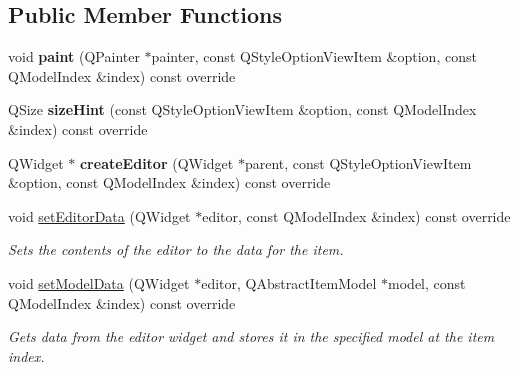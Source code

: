 \subsection*{Public Member Functions}
\begin{DoxyCompactItemize}
\item 
\mbox{\label{classrev_1_1_view_1_1_blueprint_delegate_a1fa3801da83fd392a2c16dec968759f6}} 
void {\bfseries paint} (Q\+Painter $\ast$painter, const Q\+Style\+Option\+View\+Item \&option, const Q\+Model\+Index \&index) const override
\item 
\mbox{\label{classrev_1_1_view_1_1_blueprint_delegate_ade2ca53b91e59075aa45903e70c62b88}} 
Q\+Size {\bfseries size\+Hint} (const Q\+Style\+Option\+View\+Item \&option, const Q\+Model\+Index \&index) const override
\item 
\mbox{\label{classrev_1_1_view_1_1_blueprint_delegate_a478649e1f46178761d1dbe019ed22393}} 
Q\+Widget $\ast$ {\bfseries create\+Editor} (Q\+Widget $\ast$parent, const Q\+Style\+Option\+View\+Item \&option, const Q\+Model\+Index \&index) const override
\item 
void \mbox{\hyperlink{classrev_1_1_view_1_1_blueprint_delegate_a2b9b9f5e05003be17cd3aa34202b20cf}{set\+Editor\+Data}} (Q\+Widget $\ast$editor, const Q\+Model\+Index \&index) const override
\begin{DoxyCompactList}\small\item\em Sets the contents of the editor to the data for the item. \end{DoxyCompactList}\item 
\mbox{\label{classrev_1_1_view_1_1_blueprint_delegate_ac1af608a5f40061435b3f377c29f5f71}} 
void \mbox{\hyperlink{classrev_1_1_view_1_1_blueprint_delegate_ac1af608a5f40061435b3f377c29f5f71}{set\+Model\+Data}} (Q\+Widget $\ast$editor, Q\+Abstract\+Item\+Model $\ast$model, const Q\+Model\+Index \&index) const override
\begin{DoxyCompactList}\small\item\em Gets data from the editor widget and stores it in the specified model at the item index. \end{DoxyCompactList}\end{DoxyCompactItemize}


